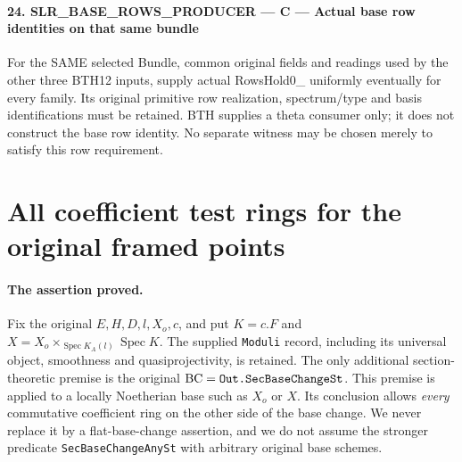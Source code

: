 \documentclass[11pt,a4paper]{article}
\numberwithin{equation}{section}
\theoremstyle{remark}\newtheorem{remark}[theorem]{Remark}
\begin{document}
\paragraph{24. SLR\_\allowbreak BASE\_\allowbreak ROWS\_\allowbreak PRODUCER — C — Actual base row identities on that same bundle}

For the SAME selected Bundle, common original fields and readings used by the other three BTH12 inputs, supply actual RowsHold0\_ uniformly eventually for every family. Its original primitive row realization, spectrum/type and basis identifications must be retained. BTH supplies a theta consumer only; it does not construct the base row identity. No separate witness may be chosen merely to satisfy this row requirement.



\clearpage
\section{All coefficient test rings for the original framed points}

\paragraph{The assertion proved.}
Fix the original \(E,H,D,l,X_o,c\), and put \(K=c.F\) and
\(X=X_o\times_{\operatorname{Spec}K_A(l)}\operatorname{Spec}K\).
The supplied \texttt{Moduli} record, including its universal object,
smoothness and quasiprojectivity, is retained.  The only additional
section-theoretic premise is the original
\(\mathrm{BC}=\texttt{Out.\allowbreak Sec\allowbreak Base\allowbreak Change\allowbreak St}\).  This premise is applied
to a locally Noetherian base such as \(X_o\) or \(X\).  Its conclusion
allows \emph{every} commutative coefficient ring on the other side of
the base change.  We never replace it by a flat-base-change assertion,
and we do not assume the stronger predicate
\texttt{Sec\allowbreak Base\allowbreak Change\allowbreak Any\allowbreak St} with arbitrary original base schemes.
\end{document}
